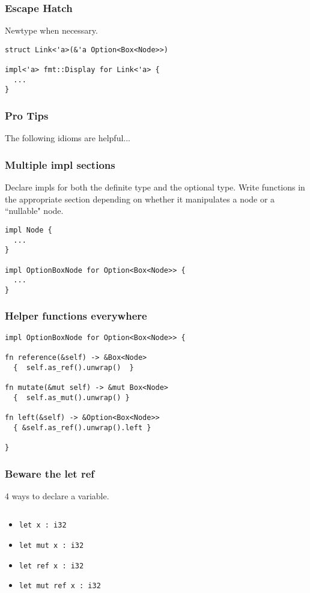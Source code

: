 \documentclass{beamer}
\begin{document}
\begin{frame}[fragile]
\frametitle{Escape Hatch}
Newtype when necessary.
\begin{verbatim}
struct Link<'a>(&'a Option<Box<Node>>)

impl<'a> fmt::Display for Link<'a> {
  ...
}
\end{verbatim}
\end{frame}

\begin{frame}
\frametitle{Pro Tips}
The following idioms are helpful...
\end{frame}

\begin{frame}[fragile]
\frametitle{Multiple impl sections}
Declare impls for both the definite type and the optional type. Write functions in the appropriate section depending on whether it manipulates a node or a ``nullable" node.
\begin{verbatim}
impl Node {
  ...
}

impl OptionBoxNode for Option<Box<Node>> {
  ...
}
\end{verbatim}
\end{frame}

\begin{frame}[fragile]
\frametitle{Helper functions everywhere}
\begin{verbatim}
impl OptionBoxNode for Option<Box<Node>> {

fn reference(&self) -> &Box<Node>
  {  self.as_ref().unwrap()  }

fn mutate(&mut self) -> &mut Box<Node>
  {  self.as_mut().unwrap() }

fn left(&self) -> &Option<Box<Node>>
  { &self.as_ref().unwrap().left }
  
}
\end{verbatim}
\end{frame}

\begin{frame}[fragile]
\frametitle{Beware the let ref}
4 ways to declare a variable.
\begin{columns}
\begin{column}{0.5\textwidth}
\begin{itemize}
\item \verb#let x : i32#
\item \verb#let mut x : i32#
\item \verb#let ref x : i32#
\item \verb#let mut ref x : i32#
\end{itemize}
\end{column}
\begin{column}{0.5\textwidth}
\end{column}
\end{columns}
\end{frame}
\end{document}
